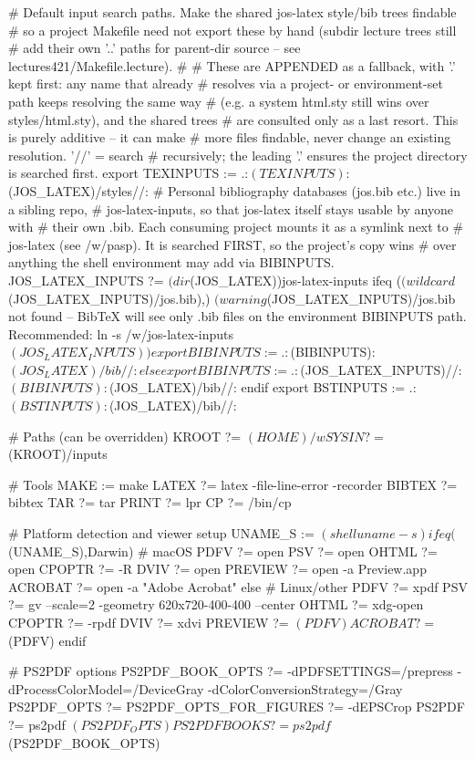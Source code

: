 # Default input search paths. Make the shared jos-latex style/bib trees findable
# so a project Makefile need not export these by hand (subdir lecture trees still
# add their own '..' paths for parent-dir source -- see lectures421/Makefile.lecture).
#
# These are APPENDED as a fallback, with '.' kept first: any name that already
# resolves via a project- or environment-set path keeps resolving the same way
# (e.g. a system html.sty still wins over styles/html.sty), and the shared trees
# are consulted only as a last resort.  This is purely additive -- it can make
# more files findable, never change an existing resolution.  '//' = search
# recursively; the leading '.' ensures the project directory is searched first.
export TEXINPUTS := .:$(TEXINPUTS):$(JOS_LATEX)/styles//:
# Personal bibliography databases (jos.bib etc.) live in a sibling repo,
# jos-latex-inputs, so that jos-latex itself stays usable by anyone with
# their own .bib.  Each consuming project mounts it as a symlink next to
# jos-latex (see /w/pasp).  It is searched FIRST, so the project's copy wins
# over anything the shell environment may add via BIBINPUTS.
JOS_LATEX_INPUTS ?= $(dir $(JOS_LATEX))jos-latex-inputs
ifeq ($(wildcard $(JOS_LATEX_INPUTS)/jos.bib),)
$(warning $(JOS_LATEX_INPUTS)/jos.bib not found -- BibTeX will see only .bib files on the environment BIBINPUTS path. Recommended: ln -s /w/jos-latex-inputs $(JOS_LATEX_INPUTS))
export BIBINPUTS := .:$(BIBINPUTS):$(JOS_LATEX)/bib//:
else
export BIBINPUTS := .:$(JOS_LATEX_INPUTS)//:$(BIBINPUTS):$(JOS_LATEX)/bib//:
endif
export BSTINPUTS := .:$(BSTINPUTS):$(JOS_LATEX)/bib//:

# Paths (can be overridden)
KROOT ?= $(HOME)/w
SYSIN ?= $(KROOT)/inputs

# Tools
MAKE := make
LATEX ?= latex -file-line-error -recorder
BIBTEX ?= bibtex
TAR ?= tar
PRINT ?= lpr
CP ?= /bin/cp

# Platform detection and viewer setup
UNAME_S := $(shell uname -s)
ifeq ($(UNAME_S),Darwin)
    # macOS
    PDFV ?= open
    PSV ?= open
    OHTML ?= open
    CPOPTR ?= -R
    DVIV ?= open
    PREVIEW ?= open -a Preview.app
    ACROBAT ?= open -a "Adobe Acrobat"
else
    # Linux/other
    PDFV ?= xpdf
    PSV ?= gv --scale=2 -geometry 620x720-400-400 --center
    OHTML ?= xdg-open
    CPOPTR ?= -rpdf
    DVIV ?= xdvi
    PREVIEW ?= $(PDFV)
    ACROBAT ?= $(PDFV)
endif

# PS2PDF options
PS2PDF_BOOK_OPTS ?= -dPDFSETTINGS=/prepress -dProcessColorModel=/DeviceGray -dColorConversionStrategy=/Gray
PS2PDF_OPTS ?=
PS2PDF_OPTS_FOR_FIGURES ?= -dEPSCrop
PS2PDF ?= ps2pdf $(PS2PDF_OPTS)
PS2PDFBOOKS ?= ps2pdf $(PS2PDF_BOOK_OPTS)

